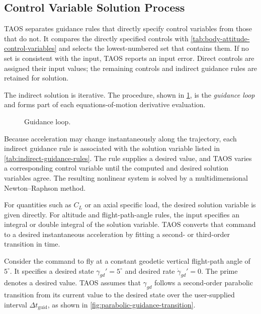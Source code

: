 \subsection{Control Variable Solution Process}\label{sec:control-variable-solution}

TAOS separates guidance rules that directly specify control variables from those
that do not. It compares the directly specified controls with
\cref{tab:body-attitude-control-variables} and selects the lowest-numbered set
that contains them. If no set is consistent with the input, TAOS reports an input
error. Direct controls are assigned their input values; the remaining controls and
indirect guidance rules are retained for solution.

The indirect solution is iterative. The procedure, shown in
\cref{fig:guidance-loop}, is the \emph{guidance loop} and forms part of each
equations-of-motion derivative evaluation.

\begin{figure}[htbp]
  \centering
  
  \caption{Guidance loop.}
  \label{fig:guidance-loop}
\end{figure}

Because acceleration may change instantaneously along the trajectory, each indirect
guidance rule is associated with the solution variable listed in
\cref{tab:indirect-guidance-rules}. The rule supplies a desired value, and TAOS
varies a corresponding control variable until the computed and desired solution
variables agree. The resulting nonlinear system is solved by a multidimensional
Newton--Raphson method.

For quantities such as $C_L$ or an axial specific load, the desired solution variable
is given directly. For altitude and flight-path-angle rules, the input specifies an
integral or double integral of the solution variable. TAOS converts that command to
a desired instantaneous acceleration by fitting a second- or third-order transition
in time.


Consider the command to fly at a constant geodetic vertical flight-path angle of
$5^\circ$. It specifies a desired state $\gamma_{gd}'=5^\circ$ and desired rate
$\dot\gamma_{gd}'=0$. The prime denotes a desired value. TAOS assumes that
$\gamma_{gd}$ follows a second-order parabolic transition from its current value to
the desired state over the user-supplied interval $\Delta t_{\mathrm{guid}}$, as
shown in \cref{fig:parabolic-guidance-transition}.

